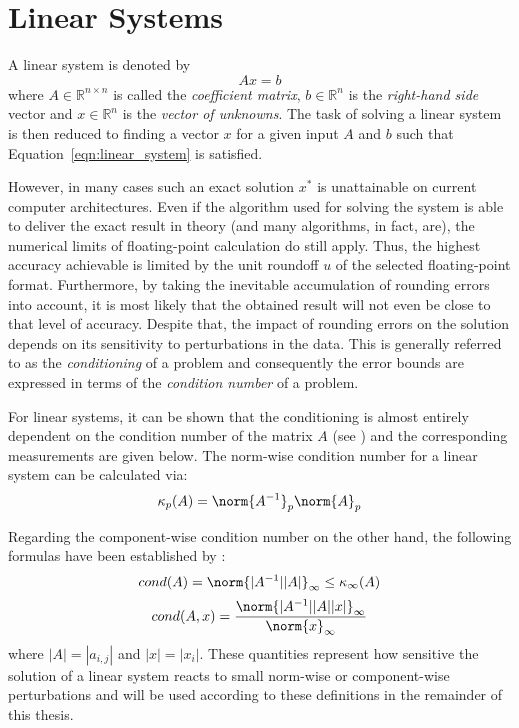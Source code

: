 \section{Linear Systems}
\label{sec:linear_systems}

\noindent A linear system is denoted by
\begin{equation}
\label{eqn:linear_system}
    Ax=b
\end{equation}
\noindent where $A \in \mathbb{R}^{n \times n}$ is called the \textit{coefficient matrix}, $b \in \mathbb{R}^{n}$ is the \textit{right-hand side} vector and $x \in \mathbb{R}^{n}$ is the \textit{vector of unknowns}. The task of solving a linear system is then reduced to finding a vector $x$ for a given input $A$ and $b$ such that Equation~\hyperref[eqn:linear_system]{\ref{eqn:linear_system}} is satisfied.

However, in many cases such an exact solution $x^*$ is unattainable on current computer architectures. Even if the algorithm used for solving the system is able to deliver the exact result in theory (and many algorithms, in fact, are), the numerical limits of floating-point calculation do still apply. Thus, the highest accuracy achievable is limited by the unit roundoff $u$ of the selected floating-point format. Furthermore, by taking the inevitable accumulation of rounding errors into account, it is most likely that the obtained result will not even be close to that level of accuracy. Despite that, the impact of rounding errors on the solution depends on its sensitivity to perturbations in the data. This is generally referred to as the \textit{conditioning} of a problem and consequently the error bounds are expressed in terms of the \textit{condition number} of a problem.

For linear systems, it can be shown that the conditioning is almost entirely dependent on the condition number of the matrix $A$ (see \cite{higham_accuracy_2002}) and the corresponding measurements are given below. The norm-wise condition number for a linear system can be calculated via:
\begin{equation}
\kappa_{p}(A) = \norm{A^{-1}}_p\norm{A}_p
\end{equation}

\noindent Regarding the component-wise condition number on the other hand, the following formulas have been established by \cite{skeel_scaling_1979}:
\begin{equation}
cond(A) = \norm{|A^{-1}||A|}_\infty \leq \kappa_{\infty}(A)
\end{equation}
\begin{equation}
cond(A,x) = \frac{\norm{|A^{-1}||A||x|}_\infty}{\norm{x}_\infty}
\end{equation}
\noindent where $|A| = |a_{i,j}|$ and $|x| = |x_{i}|$. These quantities represent how sensitive the solution of a linear system reacts to small norm-wise or component-wise perturbations and will be used according to these definitions in the remainder of this thesis.
